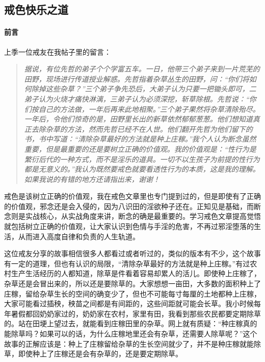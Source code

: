 \subsection{戒色快乐之道}

\paragraph{前言}

上季一位戒友在我帖子里的留言：

\begin{quote}\it
    据说，有位先哲的弟子个个学富五车。一日，他带三个弟子来到一片荒芜的田野，现场进行传道授业解惑。先哲指着杂草丛生的田野，问：“你们将如何除掉这些杂草？”三个弟子争先恐后，大弟子认为只要一把锄头即可，二弟子认为火烧才痛快淋漓，三弟子认为必须深挖，斩草除根。先哲说：“你们按自己的方法做，一年后再来此地相聚。”三个弟子果然将杂草清除殆尽。一年后，令他们惊奇的是，田野里长出的新草依然郁郁葱葱。他们想知道真正去除杂草的方法，然而先哲已经不在人世。他们翻开先哲为他们留下的书，书中写道：“清除杂草最好的方法就是种上庄稼。”我个人认为断念虽然重要，但是最重要的还是要树立正确的价值观。我的价值观是：“性行为是繁衍后代的一种方式，而不是淫乐的道具。一切不以生孩子为前提的性行为都是无意义的。”我认为既然要戒色就要看透性行为的本质，这是我的理解。如果我说的有错的地方还请指出来，谢谢！
\end{quote}

戒色是该树立正确的价值观，我在戒色文章里也专门提到过的，但是即使有了正确的价值观，邪念还是会入侵的，因为八识田的淫欲种子还在。正知见是基础，而断念则是实战核心，从实战角度来讲，断念的确是最重要的。学习戒色文章提高觉悟就包括树立正确的价值观，让大家认识到色情与手淫的危害，不再过邪淫堕落的生活，从而进入高度自律和负责的人生轨道。

这位戒友分享的故事相信很多人都看过或者听过的，类似的版本有不少，这个故事有一定的道理，但也有认识的局限，“清除杂草最好的方法就是种上庄稼。”有过农村生产生活经历的人都知道，除草是件看着容易却累人的活儿。即使种上庄稼了，杂草还是会冒出来的，所以还是要除草的。大家想想一亩田，大多数的面积种上了庄稼，留给杂草生长的空间的确变少了，但也不可能每寸每厘的土地都种上庄稼，大家可能看过插秧，秧苗之间都是有间距的，这些间距就可能会长草。我小时候每年暑假都回奶奶家过的，奶奶家在农村，家里有田，我看到那些农民都要定期除草的。站在田埂上望过去，就能看到庄稼田里的杂草。网上就有质疑：“种庄稼真的能除草吗？如果可以的话，为什么庄稼地里还会有杂草，还需要人除草呢？”这个故事的正解应该是：种上了庄稼留给杂草的生长空间就少了，并不是种庄稼就能除草，即使种上了庄稼还是会有杂草的，还是要定期除草。

